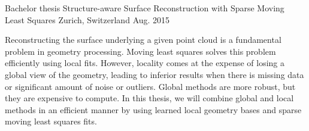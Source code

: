 \begin{cventries}
  \cventry
    {Bachelor thesis} %
    {Structure-aware Surface Reconstruction with Sparse Moving Least Squares} %
    {Zurich, Switzerland} %
    {Aug. 2015} %
    {
      \begin{cvitems} %
        \item {
        Reconstructing the surface underlying a given point cloud is a fundamental problem in geometry processing. Moving least squares solves this problem efficiently using local fits. However, locality comes at the expense of losing a global view of the geometry, leading to inferior results when there is missing data or significant amount of noise or outliers. Global methods are more robust, but they are expensive to compute. In this thesis, we will combine global and local methods in an efficient manner by using learned local geometry bases and sparse moving least squares fits.
        }
      \end{cvitems}
    }

\end{cventries}
